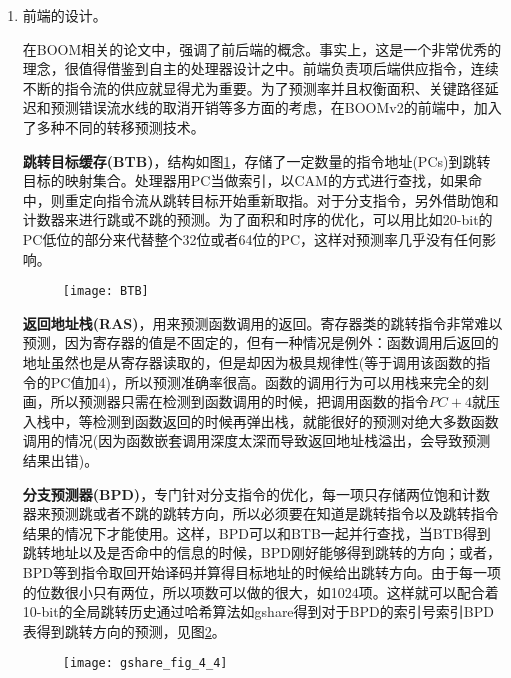 \begin{enumerate}[label=(\alph*)]
	\item 前端的设计。
	
	在BOOM相关的论文\citep{Celio:EECS-2017-157,Celio:EECS-2018-151}中，强调了前后端的概念。事实上，这是一个非常优秀的理念，很值得借鉴到自主的处理器设计之中。前端负责项后端供应指令，连续不断的指令流的供应就显得尤为重要。为了预测率并且权衡面积、关键路径延迟和预测错误流水线的取消开销等多方面的考虑，在BOOMv2的前端中，加入了多种不同的转移预测技术。
	
	\textbf{跳转目标缓存(BTB)}，结构如图\ref{fig:BTB}，存储了一定数量的指令地址(PCs)到跳转目标的映射集合。处理器用PC当做索引，以CAM的方式进行查找，如果命中，则重定向指令流从跳转目标开始重新取指。对于分支指令，另外借助饱和计数器来进行跳或不跳的预测。为了面积和时序的优化，可以用比如20-bit的PC低位的部分来代替整个32位或者64位的PC\citep{Celio:EECS-2017-157}，这样对预测率几乎没有任何影响。
	\begin{figure}[!htbp]
		\centering
		\texttt{[image: BTB]}
		\label{fig:BTB}
	\end{figure}

	\textbf{返回地址栈(RAS)}，用来预测函数调用的返回。寄存器类的跳转指令非常难以预测，因为寄存器的值是不固定的，但有一种情况是例外：函数调用后返回的地址虽然也是从寄存器读取的，但是却因为极具规律性(等于调用该函数的指令的PC值加4)，所以预测准确率很高。函数的调用行为可以用栈来完全的刻画，所以预测器只需在检测到函数调用的时候，把调用函数的指令$ PC+4 $就压入栈中，等检测到函数返回的时候再弹出栈，就能很好的预测对绝大多数函数调用的情况(因为函数嵌套调用深度太深而导致返回地址栈溢出，会导致预测结果出错)。
	
	\textbf{分支预测器(BPD)}，专门针对分支指令的优化，每一项只存储两位饱和计数器来预测跳或者不跳的跳转方向，所以必须要在知道是跳转指令以及跳转指令结果的情况下才能使用。这样，BPD可以和BTB一起并行查找，当BTB得到跳转地址以及是否命中的信息的时候，BPD刚好能够得到跳转的方向；或者，BPD等到指令取回开始译码并算得目标地址的时候给出跳转方向。由于每一项的位数很小只有两位，所以项数可以做的很大，如1024项。这样就可以配合着10-bit的全局跳转历史通过哈希算法如gshare得到对于BPD的索引号索引BPD表得到跳转方向的预测，见图\ref{fig:gshare}。
	
	\begin{figure}[!htbp]
		\centering
		\texttt{[image: gshare\_fig\_4\_4]}
		\label{fig:gshare}
	\end{figure}


\end{enumerate}
